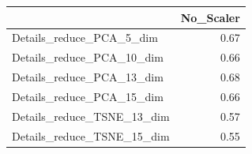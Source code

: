\documentclass[12pt,italian]{report}
\begin{document}
\begin{table}[h]
	\begin{center}
		\begin{adjustbox}{max width=\textwidth, max totalheight={5.5cm}}
			\begin{tabular}{lr}
				\toprule
				{} &  No\_Scaler \\
				\midrule
				Details\_reduce\_PCA\_5\_dim   &   0.67 \\
				Details\_reduce\_PCA\_10\_dim  &   0.66 \\
				Details\_reduce\_PCA\_13\_dim  &   \cellcolor{orange}0.68 \\
				Details\_reduce\_PCA\_15\_dim  &   0.66 \\
				Details\_reduce\_TSNE\_13\_dim &   0.57 \\
				Details\_reduce\_TSNE\_15\_dim &   0.55 \\
				\bottomrule
			\end{tabular}
		\end{adjustbox}
	\end{center}
\end{table}
\end{document}
